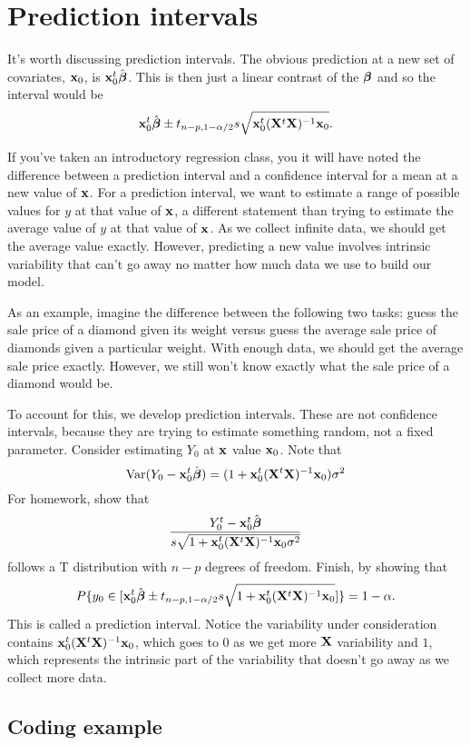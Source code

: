 \section{Prediction intervals}

It's worth discussing prediction intervals. The obvious prediction
at a new set of covariates, $\mathbf{x}_0$, is $\mathbf{x}_0^t \hat {\boldsymbol{\beta}}$. This is 
then just a linear contrast of the $\boldsymbol{\beta}$ and so the interval would be
$$
\mathbf{x}_0^t \hat {\boldsymbol{\beta}}
\pm t_{n-p, 1-\alpha/2} s \sqrt{\mathbf{x}_0^t (\mathbf{X}^t \mathbf{X})^{-1} \mathbf{x}_0}.
$$

If you've taken an introductory regression class, you it will have noted
the difference between a prediction interval and a confidence interval
for a mean at a new value of $\mathbf{x}$. For a prediction interval, we
want to estimate a range of possible values for $y$ at that value
of $\mathbf{x}$, a different statement than trying to estimate the average
value of $y$ at that value of $\mathbf{x}$. As we collect infinite data,
we should get the average value exactly. However, predicting a new
value involves intrinsic variability that can't go away no matter
how much data we use to build our model. 

As an example, imagine the difference between the following two tasks:
guess the sale price of a diamond given its weight
versus guess the average sale price of diamonds 
given a particular weight. With enough data, we should get the average
sale price exactly. However, we still won't know exactly what the sale
price of a diamond would be. 

To account for this, we develop prediction intervals. These
are not confidence intervals, because they are trying to estimate
something random, not a fixed parameter. 
Consider estimating $Y_0$ at $\mathbf{x}$ value $\mathbf{x}_0$. 
Note that
$$
\mbox{Var}(Y_0 - \mathbf{x}_0^t \hat {\boldsymbol{\beta}}) = (1 + \mathbf{x}_0^t (\mathbf{X}^t \mathbf{X})^{-1} \mathbf{x}_0)\sigma^2
$$
For homework,
show that 
$$
\frac{Y_0^t - \mathbf{x}_0^t \hat {\boldsymbol{\beta}}}{s\sqrt{1 + \mathbf{x}_0^t (\mathbf{X}^t \mathbf{X})^{-1} \mathbf{x}_0 \sigma^2}}
$$
follows a T distribution with $n-p$ degrees of freedom. Finish, by showing that
$$
P\{y_0 \in [\mathbf{x}_0^t \hat {\boldsymbol{\beta}}
\pm t_{n-p, 1-\alpha/2} s \sqrt{1 + \mathbf{x}_0^t (\mathbf{X}^t \mathbf{X})^{-1} \mathbf{x}_0}]\} = 1 - \alpha.
$$
This is called a prediction interval. Notice the variability under consideration
contains $\mathbf{x}_0^t (\mathbf{X}^t \mathbf{X})^{-1} \mathbf{x}_0$, which goes to 0 as we get more $\mathbf{X}$ variability
and $1$, which represents the intrinsic part of the variability that doesn't
go away as we collect more data.


\subsection{Coding example}

